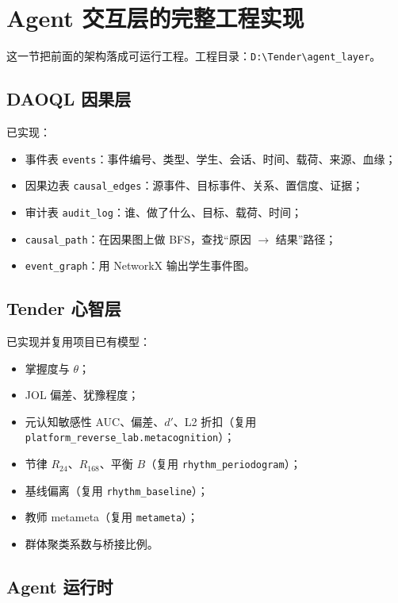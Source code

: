 \documentclass[UTF8,a4paper,11pt]{ctexart}
\begin{document}
\section{Agent 交互层的完整工程实现}

这一节把前面的架构落成可运行工程。工程目录：\texttt{D:\textbackslash Tender\textbackslash agent\_layer}。

\subsection{DAOQL 因果层}

已实现：

\begin{itemize}[leftmargin=2em]
\item 事件表 \texttt{events}：事件编号、类型、学生、会话、时间、载荷、来源、血缘；
\item 因果边表 \texttt{causal\_edges}：源事件、目标事件、关系、置信度、证据；
\item 审计表 \texttt{audit\_log}：谁、做了什么、目标、载荷、时间；
\item \texttt{causal\_path}：在因果图上做 BFS，查找“原因 $\to$ 结果”路径；
\item \texttt{event\_graph}：用 NetworkX 输出学生事件图。
\end{itemize}

\subsection{Tender 心智层}

已实现并复用项目已有模型：

\begin{itemize}[leftmargin=2em]
\item 掌握度与 $\theta$；
\item JOL 偏差、犹豫程度；
\item 元认知敏感性 AUC、偏差、$d'$、L2 折扣（复用 \texttt{platform\_reverse\_lab.metacognition}）；
\item 节律 $R_{24}$、$R_{168}$、平衡 $B$（复用 \texttt{rhythm\_periodogram}）；
\item 基线偏离（复用 \texttt{rhythm\_baseline}）；
\item 教师 metameta（复用 \texttt{metameta}）；
\item 群体聚类系数与桥接比例。
\end{itemize}

\subsection{Agent 运行时}
\end{document}
